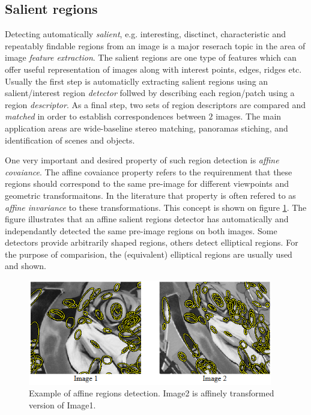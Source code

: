 \subsection{Salient regions}

Detecting automatically {\em salient}, e.g.  interesting, disctinct, characteristic and repeatably findable regions from an image is a major reserach topic in the area of image {\em feature extraction}. The salient regions are one type of features which can offer useful representation of images along with interest points, edges, ridges etc. Usually the first step is automaticlly extracting salient regions using an salient/interest region {\em detector} follwed by describing each region/patch using a region {\em descriptor}. As a final step, two sets of region descriptors are compared and {\em matched} in order to establish correspondences between $2$ images. The main application areas are wide-baseline stereo matching, panoramas stiching,  and identification of scenes and objects. 

One very important and desired property of such region detection is {\em affine covaiance}.  The affine covaiance property refers to the requirenment that these regions should correspond to the same pre-image for different viewpoints and geometric transformaitons. In the literature that property is often refered to as {\em affine invariance} to these transformations. 
This concept is shown on figure \ref{fig:affreg}. The figure illustrates that an affine salient regions detector has automatically and independantly detected the same pre-image regions on both images. Some detectors provide arbitrarily shaped regions, others detect elliptical regions. For the purpose of comparision, the (equivalent) elliptical regions are usually used and shown.
\begin{figure}[H]
\begin{center}
\includegraphics[width=0.95\textwidth]{fig/AffineRegions}
\end{center}
\caption{Example of affine regions detection. Image2 is affinely transformed version of Image1.}
\label{fig:affreg}
\end{figure}

